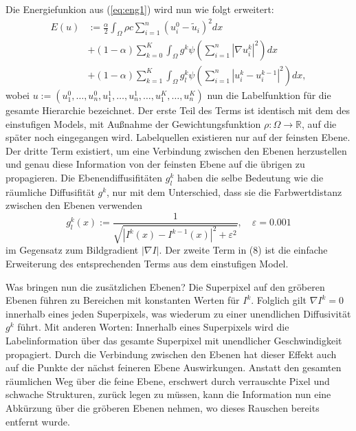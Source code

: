 Die Energiefunkion aus (\ref{eq:eng1}) wird nun wie folgt erweitert:
\begin{equation}
\begin{split}
    E(u) &:= \frac{\alpha}{2} \int_\Omega \rho c \sum \limits_{i=1}^n (u_i^0 - \tilde u_i)^2 dx \\
    & + (1-\alpha) \sum \limits_{k=0}^K \int_\Omega g^k \psi \left( \sum \limits_{i=1}^n \left| \nabla u_i^k \right|^2 \right) dx \\
    & + (1-\alpha) \sum \limits_{k=1}^K \int_\Omega g_l^k \psi \left( \sum \limits_{i=1}^n \left| u_i^k -u_i^{k-1} \right|^2 \right) dx,
\end{split}
\label{eq:eng2}
\end{equation}
wobei $u:=(u_1^0,\dotsc,u_n^0,u_1^1,\dotsc,u_n^1,\dotsc,u_1^K,\dotsc,u_n^K)$ nun die Labelfunktion für die gesamte Hierarchie bezeichnet.
Der erste Teil des Terms ist identisch mit dem des einstufigen Models, mit Außnahme der Gewichtungsfunktion $\rho:\Omega \rightarrow \mathbb{R}$,
auf die später noch eingegangen wird. Labelquellen existieren nur auf der feinsten Ebene.
Der dritte Term existiert, um eine Verbindung zwischen den Ebenen herzustellen und genau diese Information von der feinsten Ebene
auf die übrigen zu propagieren. Die Ebenendiffusifitäten $g_l^k$ haben die selbe Bedeutung wie die räumliche Diffusifität $g^k$, nur mit
dem Unterschied, dass sie die Farbwertdistanz zwischen den Ebenen verwenden
\begin{equation}
  g_l^k(x) := \frac{1}{\sqrt{ \left| I^k(x) - I^{k-1}(x) \right|^2 + \varepsilon^2}}, \quad \varepsilon = 0.001
\end{equation}
 im Gegensatz zum Bildgradient $|\nabla I|$.
Der zweite Term in (8) ist die einfache Erweiterung des entsprechenden Terms aus dem einstufigen Model.

Was bringen nun die zusätzlichen Ebenen? Die Superpixel auf den gröberen Ebenen führen zu Bereichen mit konstanten Werten für $I^k$.
Folglich gilt $ \nabla I^k = 0 $ innerhalb eines jeden Superpixels, was wiederum zu einer unendlichen Diffusivität $g^k$ führt.
Mit anderen Worten: Innerhalb eines Superpixels wird die Labelinformation über das gesamte Superpixel mit unendlicher Geschwindigkeit propagiert.
Durch die Verbindung zwischen den Ebenen hat dieser Effekt auch auf die Punkte der nächst feineren Ebene Auswirkungen.
Anstatt den gesamten räumlichen Weg über die feine Ebene, erschwert durch verrauschte Pixel und schwache Strukturen, zurück legen zu müssen,
kann die Information nun eine Abkürzung über die gröberen Ebenen nehmen, wo dieses Rauschen bereits entfernt wurde.

